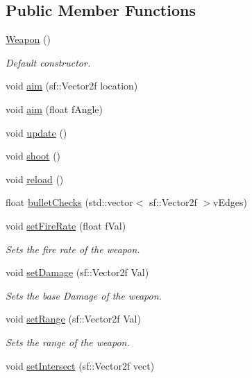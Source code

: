 \subsection*{Public Member Functions}
\begin{DoxyCompactItemize}
\item 
\hyperlink{class_weapon_a42dbc46dd70319a24763992c4ebbd396}{Weapon} ()
\begin{DoxyCompactList}\small\item\em Default constructor. \end{DoxyCompactList}\item 
void \hyperlink{class_weapon_a90f6c7c9ca1465212aa5f46b2c183aa3}{aim} (sf\+::\+Vector2f location)
\item 
void \hyperlink{class_weapon_ab6c0fa278f3270cd16a7af4bc89492f5}{aim} (float f\+Angle)
\item 
void \hyperlink{class_weapon_a1b3f76c5275b67f0bb8073157a27e736}{update} ()
\item 
void \hyperlink{class_weapon_a063d0eb2cf432d72dc22f6ec565a1a16}{shoot} ()
\item 
void \hyperlink{class_weapon_ae02c48b932b0327382c5dd1672079590}{reload} ()
\item 
float \hyperlink{class_weapon_a79520378af1fb9c1321b30b8ea3783a3}{bullet\+Checks} (std\+::vector$<$ sf\+::\+Vector2f $>$v\+Edges)
\item 
void \hyperlink{class_weapon_a4d9b20ea5832e7bcfd386bcf280acbea}{set\+Fire\+Rate} (float f\+Val)
\begin{DoxyCompactList}\small\item\em Sets the fire rate of the weapon. \end{DoxyCompactList}\item 
void \hyperlink{class_weapon_a2c78ab8b859adc6934c91d31649742f2}{set\+Damage} (sf\+::\+Vector2f Val)
\begin{DoxyCompactList}\small\item\em Sets the base Damage of the weapon. \end{DoxyCompactList}\item 
void \hyperlink{class_weapon_aedbf064d6ec5f3e9f53f58b68963b510}{set\+Range} (sf\+::\+Vector2f Val)
\begin{DoxyCompactList}\small\item\em Sets the range of the weapon. \end{DoxyCompactList}\item 
void \hyperlink{class_weapon_a72df1e4f1ff0bfd059ff68ed70ee1f6b}{set\+Intersect} (sf\+::\+Vector2f vect)

\end{DoxyCompactItemize}
